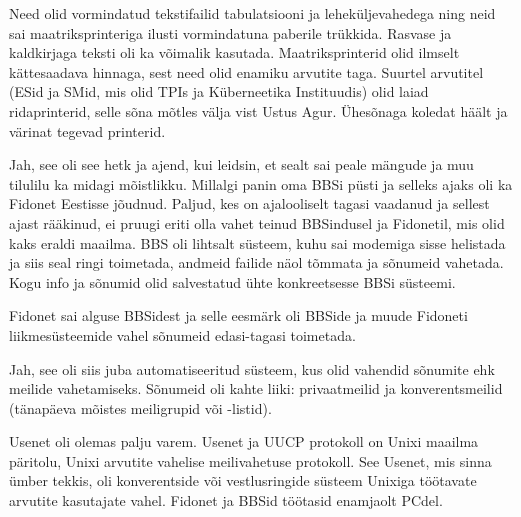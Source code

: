 
Need olid vormindatud tekstifailid 
tabulatsiooni ja leheküljevahedega ning neid sai maatriksprinteriga 
ilusti vormindatuna paberile trükkida. Rasvase 
ja kaldkirjaga teksti oli ka võimalik kasutada.
Maatriksprinterid olid ilmselt kättesaadava hinnaga, sest need olid enamiku arvutite taga. 
Suurtel arvutitel (ESid ja SMid, mis olid TPIs ja Küberneetika 
Instituudis) olid laiad ridaprinterid, selle sõna mõtles välja vist Ustus Agur. Ühesõnaga koledat häält ja värinat tegevad 
printerid.


Jah, see oli see hetk ja ajend, kui leidsin, et sealt sai
peale mängude ja muu tilulilu ka midagi mõistlikku. Millalgi panin oma BBSi 
püsti ja selleks ajaks oli ka Fidonet Eestisse 
jõudnud. Paljud, kes on ajalooliselt tagasi vaadanud ja 
sellest ajast rääkinud, ei pruugi eriti olla vahet teinud BBSindusel ja Fidonetil, mis 
olid kaks eraldi maailma. BBS oli lihtsalt 
süsteem, kuhu sai modemiga sisse helistada ja siis seal ringi toimetada, 
andmeid failide näol tõmmata ja sõnumeid 
vahetada. Kogu info ja sõnumid olid salvestatud ühte 
konkreetsesse BBSi süsteemi.

Fidonet sai alguse BBSidest ja selle eesmärk 
oli BBSide ja muude Fidoneti liikmesüsteemide vahel sõnumeid
edasi-tagasi toimetada. 


Jah, see oli siis juba automatiseeritud süsteem, kus olid vahendid 
sõnumite ehk meilide vahetamiseks. Sõnumeid oli kahte liiki: 
privaatmeilid ja konverentsmeilid (tänapäeva mõistes 
meiligrupid või -listid).


Usenet oli olemas palju varem. Usenet ja UUCP protokoll 
on Unixi maailma päritolu,  
Unixi arvutite vahelise meilivahetuse protokoll. See Usenet, mis sinna 
ümber tekkis, oli konverentside või vestlusringide 
süsteem Unixiga töötavate arvutite kasutajate vahel. Fidonet ja BBSid töötasid
enamjaolt PCdel.

